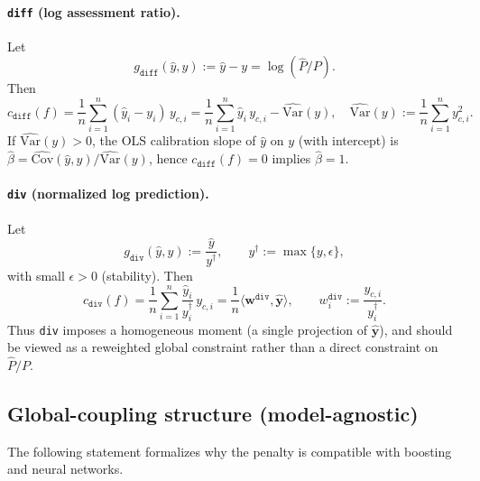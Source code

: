 \documentclass[11pt]{article}
\theoremstyle{plain}
\theoremstyle{definition}
\newcommand{\1}{\mathbf{1}}
\begin{document}
\paragraph{\texttt{diff} (log assessment ratio).}
Let
\begin{equation}
\label{eq:g_diff}
g_{\texttt{diff}}(\hat y,y):=\hat y-y=\log(\hat P/P).
\end{equation}
Then
\begin{equation}
\label{eq:cov_diff}
c_{\texttt{diff}}(f)
=\frac{1}{n}\sum_{i=1}^n (\hat y_i-y_i)\,y_{c,i}
=\frac{1}{n}\sum_{i=1}^n \hat y_i\,y_{c,i} - \widehat{\mathrm{Var}}(y),
\quad
\widehat{\mathrm{Var}}(y):=\frac{1}{n}\sum_{i=1}^n y_{c,i}^2.
\end{equation}
If $\widehat{\mathrm{Var}}(y)>0$, the OLS calibration slope of $\hat y$ on $y$ (with intercept) is
$\hat\beta=\widehat{\mathrm{Cov}}(\hat y,y)/\widehat{\mathrm{Var}}(y)$, hence $c_{\texttt{diff}}(f)=0$
implies $\hat\beta=1$.

\paragraph{\texttt{div} (normalized log prediction).}
Let
\begin{equation}
\label{eq:g_div}
g_{\texttt{div}}(\hat y,y):=\frac{\hat y}{y^\dagger},
\qquad y^\dagger:=\max\{y,\epsilon\},
\end{equation}
with small $\epsilon>0$ (stability). Then
\begin{equation}
\label{eq:cov_div}
c_{\texttt{div}}(f)
=\frac{1}{n}\sum_{i=1}^n \frac{\hat y_i}{y_i^\dagger}\,y_{c,i}
=\frac{1}{n}\langle \mathbf w^{\texttt{div}},\hat{\mathbf y}\rangle,
\qquad w^{\texttt{div}}_i:=\frac{y_{c,i}}{y_i^\dagger}.
\end{equation}
Thus \texttt{div} imposes a homogeneous moment (a single projection of $\hat{\mathbf y}$), and should be
viewed as a reweighted global constraint rather than a direct constraint on $\hat P/P$.

\subsection{Global-coupling structure (model-agnostic)}
\label{sec:structure}

The following statement formalizes why the penalty is compatible with boosting and neural networks.
\end{document}
